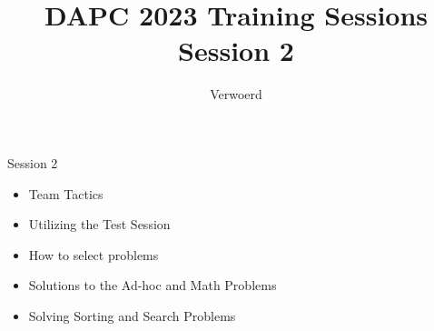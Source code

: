 \documentclass[11pt,pdf, aspectratio=169]{beamer}
\title{DAPC 2023 Training Sessions\\Session 2}
\author{Verwoerd}
\begin{document}
  \maketitle
  \begin{frame}{Session 2}
    \begin{itemize}
      \item Team Tactics
      \item Utilizing the Test Session
      \item How to select problems
      \item Solutions to the Ad-hoc and Math Problems
      \item Solving Sorting and Search Problems
    \end{itemize}
    \doclicenseThis
  \end{frame}
\end{document}

